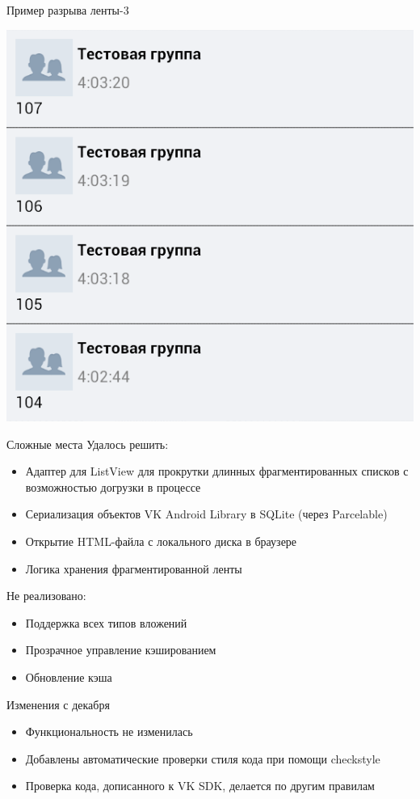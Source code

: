 \documentclass[utf8,xcolor=table]{beamer}
\begin{document}
\begin{frame}[t]{Пример разрыва ленты-3}
	\begin{center}
		\includegraphics[scale=0.5]{c.png}
	\end{center}
\end{frame}

\begin{frame}[t]{Сложные места}
	Удалось решить:
	\begin{itemize}
		\item Адаптер для ListView для прокрутки длинных фрагментированных списков с возможностью догрузки в процессе
		\item Сериализация объектов VK Android Library в SQLite (через Parcelable)
		\item Открытие HTML-файла с локального диска в браузере
		\item Логика хранения фрагментированной ленты
	\end{itemize}
	Не реализовано:
	\begin{itemize}
		\item Поддержка всех типов вложений
		\item Прозрачное управление кэшированием
		\item Обновление кэша
	\end{itemize}
\end{frame}

\begin{frame}[t]{Изменения с декабря}
	\begin{itemize}
		\item Функциональность не изменилась
		\item Добавлены автоматические проверки стиля кода при помощи checkstyle
		\item Проверка кода, дописанного к VK SDK, делается по другим правилам
	\end{itemize}
\end{frame}
\end{document}
